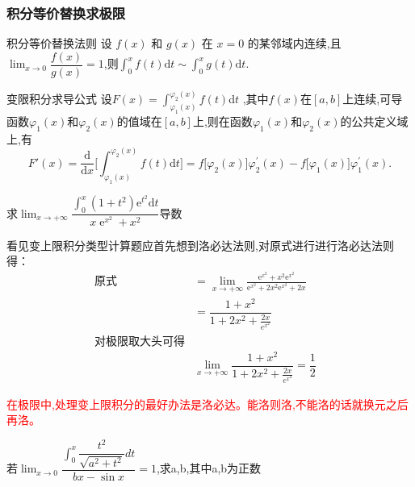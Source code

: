 \documentclass[8pt a4paper, oneside, UTF8]{ctexbook}
\begin{document}
\begin{sloppypar}
    \subsubsection{积分等价替换求极限}
    \begin{defn}{积分等价替换法则}{}
        设 $f(x)$ 和 $g(x)$ 在 $x=0$ 的某邻域内连续,且$\operatorname*{lim}_{x\rightarrow0}\dfrac{f(x)}{g(x)}=1$,则$\int_{0}^{x}f(t)\mathrm{d}t\sim\int_{0}^{x}g(t)\mathrm{d}t.$ \label{BSXJF1}
    \end{defn}
    \begin{defn}{变限积分求导公式}{}
        设$F( x) = \int _{\varphi_1( x) }^{\varphi_2( x) }f( t) $d$t$ ,其中$f(x)$在$[a,b]$上连续,可导函数$\varphi_1(x)$和$\varphi_2(x)$的值域在$[a,b]$上,则在函数$\varphi_1(x)$和$\varphi_2(x)$的公共定义域上,有
        $$
        F'(x)=\frac{\mathrm{d}}{\mathrm{d}x}\biggl[\int_{\varphi_{1}(x)}^{\varphi_{2}(x)}f(t)\mathrm{d}t\biggr]=f\bigl[\varphi_{2}(x)\bigr]\varphi_{2}^{\prime}(x)-f\bigl[\varphi_{1}(x)\bigr]\varphi_{1}^{\prime}(x).
        $$
    \end{defn}
    \begin{problem}
        求$\lim_{x\to+\infty}\dfrac{\int_0^x(1+t^2)\mathrm{e}^{t^2}\mathrm{d}t}{x\operatorname{e}^{x^2}+x^2}$导数
    \end{problem}
    \begin{solution}
        看见变上限积分类型计算题应首先想到洛必达法则,对原式进行进行洛必达法则得：
            \begin{align*}
                \text{原式} & =\lim_{x\to+\infty}\frac{\mathrm{e}^{x^2}+{x^2\mathrm{e}^{x^2}}}{\mathrm{e}^{x^2}+2x^2\mathrm{e}^{x^2}+2x}  & \\
                & =\dfrac{1+x^2}{1+2x^2+\frac{2x}{e^{x^2}}} & \\
                \text{对极限取大头可得} & \\
                & \lim_{x\to +\infty} \dfrac{1+x^2}{1+2x^2+\frac{2x}{e^{x^2}}} = \dfrac{1}{2} 
            \end{align*}
    \end{solution}
    \begin{note}
    \textcolor{red}{在极限中,处理变上限积分的最好办法是洛必达。能洛则洛,不能洛的话就换元之后再洛。}
    \end{note}
    \begin{problem}
        若$\operatorname*{lim}_{x \to 0}\dfrac{\int_{0}^{x}\dfrac{t^{2}}{\sqrt{a^{2}+t^{2}}}dt}{bx-\sin x}=1$,求a,b,其中a,b为正数
    \end{problem}
    \begin{solution}

\end{solution}
\end{sloppypar}
\end{document}

